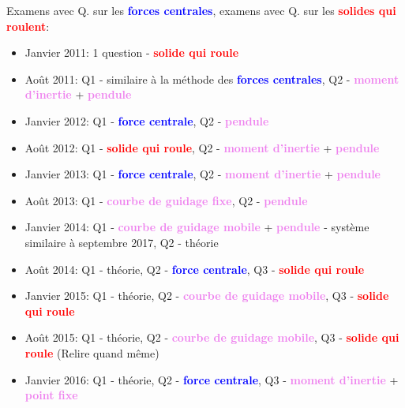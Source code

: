 \documentclass[a4paper]{article}
\begin{document}
Examens avec Q. sur les \textcolor{blue}{\textbf{forces centrales}}, examens avec Q. sur les \textcolor{red}{\textbf{solides qui roulent}}:
\begin{itemize}

\item Janvier 2011: 1 question - \textcolor{red}{\textbf{solide qui roule}}

\item Août 2011: Q1 - similaire à la méthode des \textcolor{blue}{\textbf{forces centrales}}, Q2 - \textcolor{violet}{\textbf{moment d'inertie}} + \textcolor{violet}{\textbf{pendule}}

\item Janvier 2012: Q1 - \textcolor{blue}{\textbf{force centrale}}, Q2 - \textcolor{violet}{\textbf{pendule}}

\item Août 2012: Q1 - \textcolor{red}{\textbf{solide qui roule}}, Q2 - \textcolor{violet}{\textbf{moment d'inertie}} + \textcolor{violet}{\textbf{pendule}}

\item Janvier 2013: Q1 - \textcolor{blue}{\textbf{force centrale}}, Q2 - \textcolor{violet}{\textbf{moment d'inertie}} + \textcolor{violet}{\textbf{pendule}}

\item Août 2013: Q1 - \textcolor{violet}{\textbf{courbe de guidage fixe}}, Q2 - \textcolor{violet}{\textbf{pendule}}

\item Janvier 2014: Q1 - \textcolor{violet}{\textbf{courbe de guidage mobile}} + \textcolor{violet}{\textbf{pendule}} - système similaire à septembre 2017, Q2 - théorie

\item Août 2014: Q1 - théorie, Q2 - \textcolor{blue}{\textbf{force centrale}}, Q3 - \textcolor{red}{\textbf{solide qui roule}}

\item Janvier 2015: Q1 - théorie, Q2 - \textcolor{violet}{\textbf{courbe de guidage mobile}}, Q3 - \textcolor{red}{\textbf{solide qui roule}}

\item Août 2015: Q1 - théorie, Q2 - \textcolor{violet}{\textbf{courbe de guidage mobile}}, Q3 - \textcolor{red}{\textbf{solide qui roule}} (Relire quand même)

\item Janvier 2016: Q1 - théorie, Q2 - \textcolor{blue}{\textbf{force centrale}}, Q3 - \textcolor{violet}{\textbf{moment d'inertie}} + \textcolor{violet}{\textbf{point fixe}}


\end{itemize}
\end{document}
